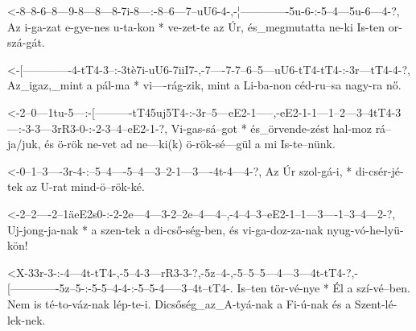   {<-8--8-6--8---9-8---8---8-7i-8---:-8--6---7--uU6-4-,-¦-------------5u-6-:-5--4---5u-6---4-?,}
  {  Az i-ga-zat e-gye-nes u-ta-kon * ve-zet-te az Úr, és_megmutatta ne-ki  Is-ten or-szá-gát.}

  {<-[-------------4-tT4-3--:-3tè7i-uU6-7iiI7-,-7----7-7--6--5---uU6-tT4-tT4-:-3r---tT4-4-?,}
  {  Az_igaz,_mint a pál-ma * vi----rág-zik,    mint a Li-ba-non céd-ru--sa    nagy-ra  nő.}


  {<-2--0---1tu-5---:-[----------tT45uj5T4-:-3r--5---eE2-1-----,-eE2-1-1---1--2---3--4tT4-3---:-3-3---3rR3-0-:-2-3--4--eE2-1-?,}
  {  Vi-gas-sá--got * és_örvende-zést        hal-moz rá--ja/juk, és  ö-rök ne-vet ad ne---ki(k) ö-rök-sé---gül a mi Is-te--nünk.}

  {<-0--1--3----3r-4-:--5--4----5--4---3--2-1---3----4t-4---4-?,}
  {  Az Úr szol-gá-i, * di-csér-jé-tek az U-rat mind-ö--rök-ké.}

  {<-2--2----2--1äeE2s0-:-2-2e---4---3-2--2e--4---4--,-4--4--3--eE2-1--1---3----1--3--4---2-?,}
  {  Uj-jong-ja-nak     * a szen-tek a di-cső-ség-ben, és vi-ga-doz-za-nak nyug-vó-he-lyü-kön!}

  {<X-33r-3-:-4---4t-tT4-,-5--4-3---rR3-3-?,-5z--4-,-5--5--5---4---3---4t-tT4-?,-[-------------5z--5-:-5-5--4-4-:-5--5-4-----3--4t--tT4-.}
  {   Is--ten tör-vé-nye * Él a szí-vé--ben. Nem is  té-to-váz-nak lép-te-i. Dicsőség_az_A-tyá-nak a Fi-ú-nak és a Szent-lé-lek-nek.}





